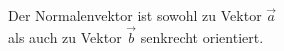 \documentclass[preview]{standalone}
\begin{document}
\begin{center}
Der Normalenvektor ist sowohl zu Vektor $\vec{a}$\\ als auch zu Vektor $\vec{b}$ senkrecht orientiert.
\end{center}
\end{document}

